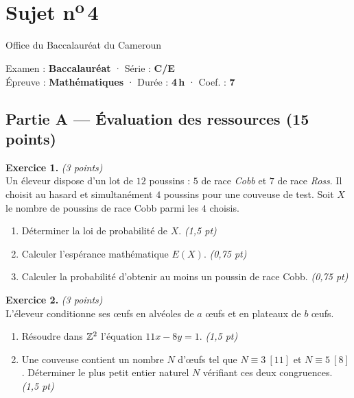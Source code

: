 \section{Sujet n\textsuperscript{o}\,4}
\noindent\begin{minipage}{0.5\linewidth}\footnotesize Office du Baccalauréat du Cameroun\end{minipage}%
\hfill\begin{minipage}{0.45\linewidth}\footnotesize\raggedleft Examen : \textbf{Baccalauréat} · Série : \textbf{C/E}\\
Épreuve : \textbf{Mathématiques} · Durée : \textbf{4\,h} · Coef. : \textbf{7}\end{minipage}
\par\smallskip{\color{onbo}\rule{\linewidth}{1pt}}

\subsection*{Partie A — Évaluation des ressources \hfill (15 points)}

\noindent\textbf{Exercice 1.} \hfill\textit{(3 points)}\\
Un éleveur dispose d'un lot de $12$ poussins : $5$ de race \emph{Cobb} et $7$ de race
\emph{Ross}. Il choisit au hasard et simultanément $4$ poussins pour une couveuse de test.
Soit $X$ le nombre de poussins de race Cobb parmi les $4$ choisis.
\begin{enumerate}[label=\arabic*)]
\item Déterminer la loi de probabilité de $X$. \hfill\textit{(1,5 pt)}
\item Calculer l'espérance mathématique $E(X)$. \hfill\textit{(0,75 pt)}
\item Calculer la probabilité d'obtenir au moins un poussin de race Cobb. \hfill\textit{(0,75 pt)}
\end{enumerate}

\smallskip
\noindent\textbf{Exercice 2.} \hfill\textit{(3 points)}\\
L'éleveur conditionne ses œufs en alvéoles de $a$ œufs et en plateaux de $b$ œufs.
\begin{enumerate}[label=\arabic*)]
\item Résoudre dans $\mathbb{Z}^2$ l'équation $11x-8y=1$. \hfill\textit{(1,5 pt)}
\item Une couveuse contient un nombre $N$ d'œufs tel que $N\equiv 3\ [11]$ et $N\equiv 5\ [8]$.
Déterminer le plus petit entier naturel $N$ vérifiant ces deux congruences. \hfill\textit{(1,5 pt)}
\end{enumerate}

